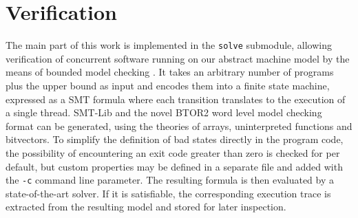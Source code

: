 \section{Verification}

The main part of this work is implemented in the \texttt{solve} submodule,
allowing verification of concurrent software running on our abstract machine model by the means of bounded model checking \cite{ref:BMC}.
It takes an arbitrary number of programs plus the upper bound as input and encodes them into a finite state machine, expressed as a SMT formula where each transition translates to the execution of a single thread.
SMT-Lib \cite{ref:SMT-Lib} and the novel BTOR2 \cite{ref:BTOR2} word level model checking format can be generated, using the theories of arrays, uninterpreted functions and bitvectors.
To simplify the definition of bad states directly in the program code, the possibility of encountering an exit code greater than zero is checked for per default, but custom properties may be defined in a separate file and added with the \texttt{-c} command line parameter.
The resulting formula is then evaluated by a state-of-the-art solver.
If it is satisfiable, the corresponding execution trace is extracted from the resulting model and stored for later inspection.



